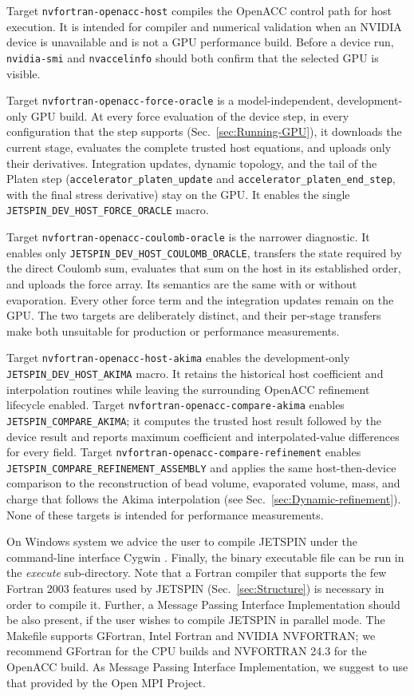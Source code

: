Target \texttt{nvfortran-openacc-host} compiles the OpenACC control path
for host execution. It is intended for compiler and numerical validation when
an NVIDIA device is unavailable and is not a GPU performance build. Before a
device run, \texttt{nvidia-smi} and \texttt{nvaccelinfo} should both
confirm that the selected GPU is visible.

Target \texttt{nvfortran-openacc-force-oracle} is a model-independent,
development-only GPU build. At every force evaluation of the device step,
in every configuration that the step supports (Sec.~\ref{sec:Running-GPU}),
it downloads the current stage, evaluates the complete trusted host
equations, and uploads only their derivatives. Integration updates, dynamic
topology, and the tail of the Platen step
(\texttt{accelerator\_platen\_update} and
\texttt{accelerator\_platen\_end\_step}, with the final stress
derivative) stay on the GPU. It enables the single
\texttt{JETSPIN\_DEV\_HOST\_FORCE\_ORACLE} macro.

Target \texttt{nvfortran-openacc-coulomb-oracle} is the narrower diagnostic.
It enables only \texttt{JETSPIN\_DEV\_HOST\_COULOMB\_ORACLE}, transfers the
state required by the direct Coulomb sum, evaluates that sum on the host in
its established order, and uploads the force array. Its semantics are the same
with or without evaporation. Every other force term and the integration
updates remain on the GPU. The two targets are deliberately distinct, and
their per-stage transfers make both unsuitable for production or performance
measurements.

Target \texttt{nvfortran-openacc-host-akima} enables the development-only
\texttt{JETSPIN\_DEV\_HOST\_AKIMA} macro. It retains the historical host
coefficient and interpolation routines while leaving the surrounding OpenACC
refinement lifecycle enabled. Target
\texttt{nvfortran-openacc-compare-akima} enables
\texttt{JETSPIN\_COMPARE\_AKIMA}; it computes the trusted host result followed
by the device result and reports maximum coefficient and interpolated-value
differences for every field. Target
\texttt{nvfortran-openacc-compare-refinement} enables
\texttt{JETSPIN\_COMPARE\_REFINEMENT\_ASSEMBLY} and applies the same
host-then-device comparison to the reconstruction of bead volume,
evaporated volume, mass, and charge that follows the Akima interpolation
(see Sec.~\ref{sec:Dynamic-refinement}). None of these targets is intended
for performance measurements.

On Windows system we advice the user to compile JETSPIN under the
command-line interface Cygwin \cite{racine2000cygwin}. Finally, the
binary executable file can be run in the \textit{execute} sub-directory.
Note that a Fortran compiler that supports the few Fortran 2003 features
used by JETSPIN (Sec.~\ref{sec:Structure}) is necessary in order to
compile it. Further, a Message Passing Interface Implementation should be
also present, if the user wishes to compile JETSPIN in parallel mode. The
Makefile supports GFortran, Intel Fortran and NVIDIA NVFORTRAN; we
recommend GFortran for the CPU builds and NVFORTRAN 24.3 for the OpenACC
build. As Message Passing Interface Implementation, we suggest to use that
provided by the Open MPI Project.

